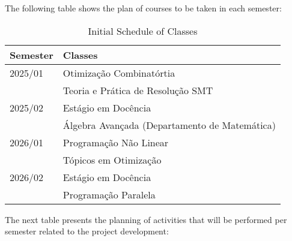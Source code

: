 \documentclass[a4paper, 12pt]{article}
\begin{document}
The following table shows the plan of courses to be taken in each
semester:

\begin{table}[!htbp]
\caption[Schedule]{Initial Schedule of Classes}
\vspace{5pt}
\centering
\renewcommand{\arraystretch}{1.2}
\begin{tabular}{@{}p{2cm}p{14cm}@{}}
\toprule
\textbf{Semester} & \textbf{Classes} \\
\midrule
2025/01
   & Otimiza\c{c}\~ao Combinat\'ortia \\
   & Teoria e Pr\'atica de Resolu\c{c}\~ao SMT \\
\hline
2025/02
   & Est\'agio em Doc\^encia \\
   & \'Algebra Avan\c{c}ada (Departamento de Matem\'atica) \\
\hline
  2026/01
  & Programa\c{c}\~ao N\~ao Linear \\
  & T\'opicos em Otimiza\c{c}\~ao \\
\hline
  2026/02
  & Est\'agio em Doc\^encia \\
  & Programa\c{c}\~ao Paralela \\

 \bottomrule
\end{tabular}
\end{table}

The next table presents the planning of activities that will be
performed per semester related to the
project development:

\renewcommand{\refname}{References}


\end{document}
